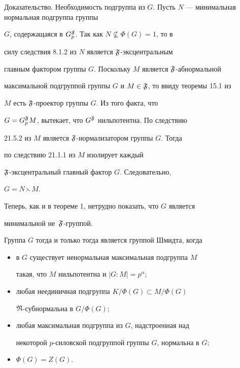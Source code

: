 \begin{pf*}{Доказательство. Необходимость}
подгруппа из $G$. Пусть $N$ --- минимальная нормальная подгруппа группы


$G$, содержащаяся в $G^{\frak F}_p$. Так как $N\nsubseteq\Phi(G)=1$, то в


силу следствия 8.1.2 из \cite{S2} $N$ является $\frak F$-эксцентральным


главным фактором группы $G$. Поскольку $M$ является $\frak F$-абнормальной


максимальной подгруппой группы $G$ и $M\in\frak F$, то ввиду теоремы 15.1 из


\cite{S2} $M$ есть $\frak F$-проектор группы $G$. Из того факта, что


$G=G^{\frak F}_p M$, вытекает, что $G^{\frak F}$ нильпотентна. По следствию


21.5.2 из \cite{S2} $M$ является $\frak F$-нормализатором группы $G$. Тогда


по следствию 21.1.1 из \cite{S2} $M$ изолирует каждый


$\frak F$-эксцентральный главный фактор $G$. Следовательно,


$G=N\leftthreetimes M$.





Теперь, как и в теореме 1, нетрудно показать, что $G$ является


минимальной не~$\frak F$-группой.


\end{pf*}


\setcounter{cor}{0}





\begin{cor}


Группа $G$ тогда и только тогда является группой Шмидта, когда


\begin{itemize}


\item[1)] в $G$ существует ненормальная максимальная подгруппа $M$


такая, что $M$ нильпотентна и $|G{:}M|=p^\alpha$;


\item[2)] любая неединичная подгруппа $K/\Phi(G)\subset M/\Phi(G)$\;


$\frak N$-субнормальна в $G/\Phi(G);$


\item[3)] любая максимальная подгруппа из $G$, надстроенная над


некоторой $p$-силовской подгруппой группы $G$, нормальна в $G;$


\item[4)] $\Phi(G)=Z(G)$.


\end{itemize}


\end{cor}





